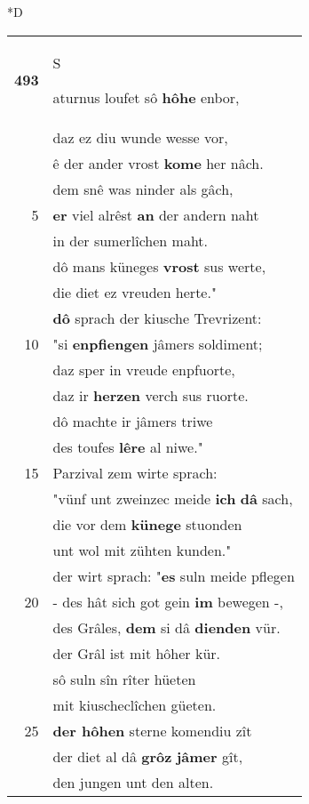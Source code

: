 \documentclass[8pt,a4paper,notitlepage]{article}
\begin{document}
\begin{table}[ht]
\begin{minipage}[t]{0.5\linewidth}
\small
\begin{center}*D
\end{center}
\begin{tabular}{rl}
\textbf{493} & \begin{large}S\end{large}aturnus loufet sô \textbf{hôhe} enbor,\\ 
 & daz ez diu wunde wesse vor,\\ 
 & ê der ander vrost \textbf{kome} her nâch.\\ 
 & dem snê was ninder als gâch,\\ 
5 & \textbf{er} viel alrêst \textbf{an} der andern naht\\ 
 & in der sumerlîchen maht.\\ 
 & dô mans küneges \textbf{vrost} sus werte,\\ 
 & die diet ez vreuden herte."\\ 
 & \textbf{dô} sprach der kiusche Trevrizent:\\ 
10 & "si \textbf{enpfiengen} jâmers soldiment;\\ 
 & daz sper in vreude enpfuorte,\\ 
 & daz ir \textbf{herzen} verch sus ruorte.\\ 
 & dô machte ir jâmers triwe\\ 
 & des toufes \textbf{lêre} al niwe."\\ 
15 & Parzival zem wirte sprach:\\ 
 & "vünf unt zweinzec meide \textbf{ich} \textbf{dâ} sach,\\ 
 & die vor dem \textbf{künege} stuonden\\ 
 & unt wol mit zühten kunden."\\ 
 & der wirt sprach: "\textbf{es} suln meide pflegen\\ 
20 & - des hât sich got gein \textbf{im} bewegen -,\\ 
 & des Grâles, \textbf{dem} si dâ \textbf{dienden} vür.\\ 
 & der Grâl ist mit hôher kür.\\ 
 & sô suln sîn rîter hüeten\\ 
 & mit kiuscheclîchen güeten.\\ 
25 & \textbf{der hôhen} sterne komendiu zît\\ 
 & der diet al dâ \textbf{grôz} \textbf{jâmer} gît,\\ 
 & den jungen unt den alten.\\ 

\end{tabular}
\end{minipage}
\end{table}
\end{document}
